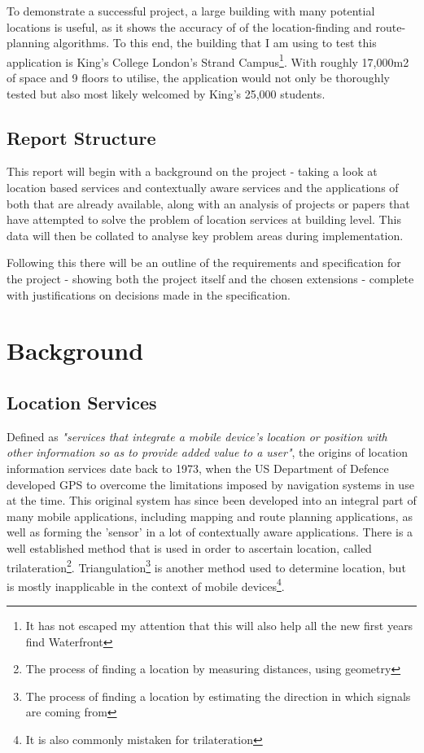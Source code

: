 \documentclass[11pt]{informatics-report}
\begin{document}
To demonstrate a successful project, a large building with many potential locations is useful, as it shows the accuracy of of the location-finding and route-planning algorithms. To this end, the building that I am using to test this application is King's College London's Strand Campus\footnote{ It has not escaped my attention that this will also help all the new first years find Waterfront}. With roughly 17,000m2 of space and 9 floors to utilise, the application would not only be thoroughly tested but also most likely welcomed by King's 25,000 students\cite{headcount}.

\section{Report Structure}

This report will begin with a background on the project - taking a look at location based services and contextually aware services and the applications of both that are already available, along with an analysis of projects or papers that have attempted to solve the problem of location services at building level. This data will then be collated to analyse key problem areas during implementation. 

Following this there will be an outline of the requirements and specification for the project - showing both the project itself and the chosen extensions - complete with justifications on decisions made in the specification.


\chapter{Background}
\section{Location Services}

Defined as \textit{"services that integrate a mobile device's location or position with other information so as to provide added value to a user"}\cite{schiller2004location}, the origins of location information services date back to 1973, when the US Department of Defence developed GPS to overcome the limitations imposed by navigation systems in use at the time\cite{national1995global}. This original system has since been developed into an integral part of many mobile applications, including mapping and route planning applications, as well as forming the 'sensor' in a lot of contextually aware applications. There is a well established method that is used in order to ascertain location, called trilateration\footnote{The process of finding a location by measuring distances, using geometry}. Triangulation\footnote{The process of finding a location by estimating the direction in which signals are coming from} is another method used to determine location, but is mostly inapplicable in the context of mobile devices\footnote{It is also commonly mistaken for trilateration}.
\end{document}
